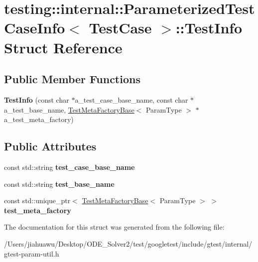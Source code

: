 \hypertarget{structtesting_1_1internal_1_1_parameterized_test_case_info_1_1_test_info}{}\section{testing\+:\+:internal\+:\+:Parameterized\+Test\+Case\+Info$<$ Test\+Case $>$\+:\+:Test\+Info Struct Reference}
\label{structtesting_1_1internal_1_1_parameterized_test_case_info_1_1_test_info}
\subsection*{Public Member Functions}
\begin{DoxyCompactItemize}
\item 
\mbox{\label{structtesting_1_1internal_1_1_parameterized_test_case_info_1_1_test_info_a97780f3a9b145f30d6803ea7b76abe19}} 
{\bfseries Test\+Info} (const char $\ast$a\+\_\+test\+\_\+case\+\_\+base\+\_\+name, const char $\ast$a\+\_\+test\+\_\+base\+\_\+name, \mbox{\hyperlink{classtesting_1_1internal_1_1_test_meta_factory_base}{Test\+Meta\+Factory\+Base}}$<$ Param\+Type $>$ $\ast$a\+\_\+test\+\_\+meta\+\_\+factory)
\end{DoxyCompactItemize}
\subsection*{Public Attributes}
\begin{DoxyCompactItemize}
\item 
\mbox{\label{structtesting_1_1internal_1_1_parameterized_test_case_info_1_1_test_info_a8e435bff3fb74db341a9d0507ceda206}} 
const std\+::string {\bfseries test\+\_\+case\+\_\+base\+\_\+name}
\item 
\mbox{\label{structtesting_1_1internal_1_1_parameterized_test_case_info_1_1_test_info_ab4be52255b150703b450d8ea7c8ab763}} 
const std\+::string {\bfseries test\+\_\+base\+\_\+name}
\item 
\mbox{\label{structtesting_1_1internal_1_1_parameterized_test_case_info_1_1_test_info_a66f82f1eb09971f2d01bd9c4773e9538}} 
const std\+::unique\+\_\+ptr$<$ \mbox{\hyperlink{classtesting_1_1internal_1_1_test_meta_factory_base}{Test\+Meta\+Factory\+Base}}$<$ Param\+Type $>$ $>$ {\bfseries test\+\_\+meta\+\_\+factory}
\end{DoxyCompactItemize}


The documentation for this struct was generated from the following file\+:\begin{DoxyCompactItemize}
\item 
/\+Users/jiahuawu/\+Desktop/\+O\+D\+E\+\_\+\+Solver2/test/googletest/include/gtest/internal/gtest-\/param-\/util.\+h\end{DoxyCompactItemize}
